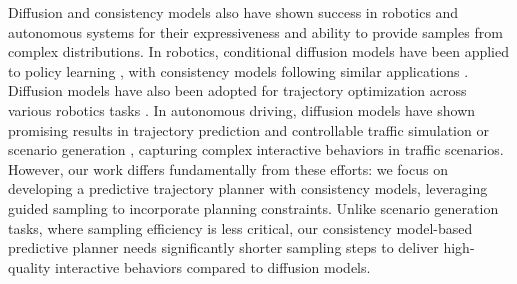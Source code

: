 Diffusion and consistency models also have shown success in robotics and autonomous systems for their expressiveness and ability to provide samples from complex distributions.
In robotics, conditional diffusion models have been applied to policy learning \citep{janner2022planning,ajay2022conditional,chi2023diffusion}, with consistency models following similar applications \citep{ding2023consistency,prasad2024consistency}.
Diffusion models have also been adopted for trajectory optimization across various robotics tasks \citep{li2024efficient,li2024constraint}.
In autonomous driving, diffusion models have shown promising results in trajectory prediction \citep{jiang2023motiondiffuser,wang2025optimizing} and controllable traffic simulation or scenario generation \citep{zhong2023guided,xu2023diffscene,chang2023controllable,huang2024versatile}, capturing complex interactive behaviors in traffic scenarios.
However, our work differs fundamentally from these efforts: we focus on developing a predictive trajectory planner with consistency models, leveraging guided sampling to incorporate planning constraints.
Unlike scenario generation tasks, where sampling efficiency is less critical, our consistency model-based predictive planner needs significantly shorter sampling steps to deliver high-quality interactive behaviors compared to diffusion models.

